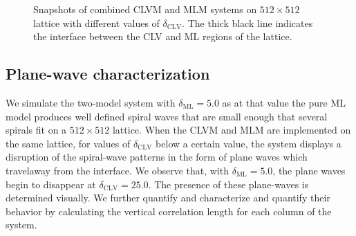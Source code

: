 \documentclass[12pt]{article}
\begin{document}
\begin{figure}[!htb]
\begin{center}
    \caption{Snapshots of combined CLVM and MLM systems on $ 512\times512 $ lattice with different values of $ \delta_{\mathrm{CLV}} $.
    The thick black line indicates the interface between the CLV and ML regions of the lattice.}
    \label{fig:plane_waves}
    \end{center} 
\end{figure}

\subsection{Plane-wave characterization}%
\label{sub:plane_wave}

We simulate the two-model system with $ \delta_{\mathrm{ML}} = 5.0 $ as at that value the pure ML model produces well defined
spiral waves that are small enough that several spirals fit on a $ 512\times512 $ lattice. When the CLVM and MLM are implemented on the same lattice, for values of $ \delta_{\mathrm{CLV}} $
below a certain value, the system displays a disruption of the spiral-wave patterns 
in the form of plane waves which travelaway from the interface. We observe that, with $ \delta_{\mathrm{ML}} = 5.0 $, the plane
waves begin to disappear at $ \delta_{\mathrm{CLV}} = 25.0 $.
The presence of these plane-waves is determined visually. 
We further quantify and characterize and quantify their behavior by calculating 
the vertical correlation length for each column of the system. 
\end{document}
